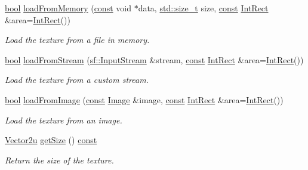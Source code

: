 \begin{DoxyCompactItemize}
\hyperlink{term__entry_8h_a002004ba5d663f149f6c38064926abac}{bool} \hyperlink{classsf_1_1_texture_a2c4adb19dd4cbee0a588eeb85e52a249}{load\-From\-Memory} (\hyperlink{term__entry_8h_a57bd63ce7f9a353488880e3de6692d5a}{const} void $\ast$data, \hyperlink{nc__alloc_8h_a7b60c5629e55e8ec87a4547dd4abced4}{std\-::size\-\_\-t} size, \hyperlink{term__entry_8h_a57bd63ce7f9a353488880e3de6692d5a}{const} \hyperlink{namespacesf_a1b1279ab06950b96686cffaacb72fed5}{Int\-Rect} \&area=\hyperlink{namespacesf_a1b1279ab06950b96686cffaacb72fed5}{Int\-Rect}())
\begin{DoxyCompactList}\small\item\em Load the texture from a file in memory. \end{DoxyCompactList}\item 
\hyperlink{term__entry_8h_a002004ba5d663f149f6c38064926abac}{bool} \hyperlink{classsf_1_1_texture_a6803a13465a7113a8964d1081841886d}{load\-From\-Stream} (\hyperlink{classsf_1_1_input_stream}{sf\-::\-Input\-Stream} \&stream, \hyperlink{term__entry_8h_a57bd63ce7f9a353488880e3de6692d5a}{const} \hyperlink{namespacesf_a1b1279ab06950b96686cffaacb72fed5}{Int\-Rect} \&area=\hyperlink{namespacesf_a1b1279ab06950b96686cffaacb72fed5}{Int\-Rect}())
\begin{DoxyCompactList}\small\item\em Load the texture from a custom stream. \end{DoxyCompactList}\item 
\hyperlink{term__entry_8h_a002004ba5d663f149f6c38064926abac}{bool} \hyperlink{classsf_1_1_texture_abec4567ad9856a3596dc74803f26fba2}{load\-From\-Image} (\hyperlink{term__entry_8h_a57bd63ce7f9a353488880e3de6692d5a}{const} \hyperlink{classsf_1_1_image}{Image} \&image, \hyperlink{term__entry_8h_a57bd63ce7f9a353488880e3de6692d5a}{const} \hyperlink{namespacesf_a1b1279ab06950b96686cffaacb72fed5}{Int\-Rect} \&area=\hyperlink{namespacesf_a1b1279ab06950b96686cffaacb72fed5}{Int\-Rect}())
\begin{DoxyCompactList}\small\item\em Load the texture from an image. \end{DoxyCompactList}\item 
\hyperlink{namespacesf_a41039649eb65ea7646e2b97cfe124b4f}{Vector2u} \hyperlink{classsf_1_1_texture_a0f370acd8f41c8b97a6959389c521c2c}{get\-Size} () \hyperlink{term__entry_8h_a57bd63ce7f9a353488880e3de6692d5a}{const} 
\begin{DoxyCompactList}\small\item\em Return the size of the texture. \end{DoxyCompactList}\item 

\end{DoxyCompactItemize}
